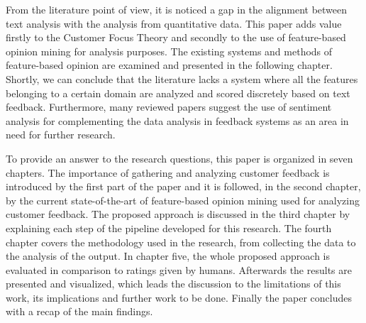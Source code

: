 From the literature point of view, it is noticed a gap in the alignment between text analysis with the analysis from quantitative data. This paper adds value firstly to the Customer Focus Theory and secondly to the use of feature-based opinion mining for analysis purposes. The existing systems and methods of feature-based opinion are examined and presented in the following chapter. Shortly, we can conclude that the literature lacks a system where all the features belonging to a certain domain are analyzed and scored discretely based on text feedback. Furthermore, many reviewed papers\cite{fradkin2016bias,liu2012sentiment,pavlou2006nature,yaakub2012integration,zhang2012weakness,dellarocas2008sound}  suggest the use of sentiment analysis for complementing the data analysis in feedback systems as an area in need for further research.

To provide an answer to the research questions, this paper is organized in seven chapters. The importance of gathering and analyzing customer feedback is introduced by the first part of the paper and it is followed, in the second chapter, by the current state-of-the-art of feature-based opinion mining used for analyzing customer feedback. The proposed approach is discussed in the third chapter by explaining each step of the pipeline developed for this research. The fourth chapter covers the methodology used in the research, from collecting the data to the analysis of the output. In chapter five, the whole proposed approach is evaluated in comparison to ratings given by humans. Afterwards the results are presented and visualized, which leads the discussion to the limitations of this work, its implications and further work to be done. Finally the paper concludes with a recap of the main findings. 